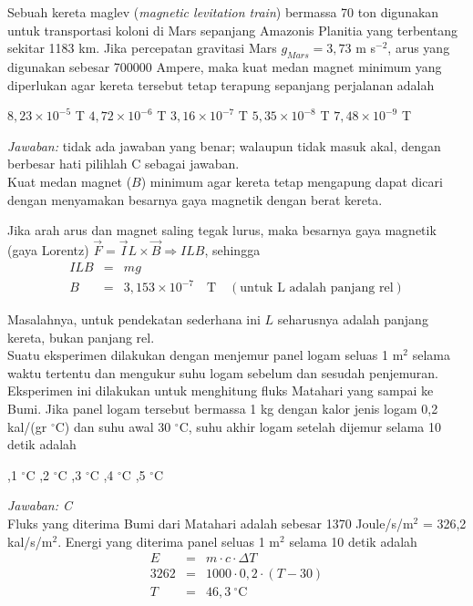 \documentclass[11pt,fleqn]{exam}
\begin{document}
\begin{questions}
\question Sebuah kereta maglev (\textit{magnetic levitation train}) bermassa 70 ton digunakan untuk transportasi koloni di Mars sepanjang Amazonis Planitia yang terbentang sekitar 1183 km. Jika percepatan gravitasi Mars $g_{Mars} = 3,73$ m s$^{-2}$, arus yang digunakan sebesar 700000 Ampere, maka kuat medan magnet minimum yang diperlukan agar kereta tersebut tetap terapung sepanjang perjalanan adalah
\begin{choices}
\choice $8,23 \times 10^{-5}$ T
\choice $4,72 \times 10^{-6}$ T
\choice $3,16 \times 10^{-7}$ T
\choice $5,35 \times 10^{-8}$ T
\choice $7,48 \times 10^{-9}$ T
\end{choices}

\textit{Jawaban: } tidak ada jawaban yang benar; walaupun tidak masuk akal, dengan berbesar hati pilihlah C sebagai jawaban.\\

Kuat medan magnet ($B$) minimum agar kereta tetap mengapung dapat dicari dengan menyamakan besarnya gaya magnetik dengan berat kereta.

Jika arah arus dan magnet saling tegak lurus, maka besarnya gaya magnetik (gaya Lorentz) $\overrightarrow{F} = \overrightarrow{I}L \times \overrightarrow{B} \Rightarrow ILB$, sehingga
\begin{eqnarray*}
ILB &=& mg\\
B &=&3,153 \times 10^{-7} \quad \text{T} \quad (\text{untuk L adalah panjang rel})
\end{eqnarray*}

Masalahnya, untuk pendekatan sederhana ini $L$ seharusnya adalah panjang kereta, bukan panjang rel.\\


\question Suatu eksperimen dilakukan dengan menjemur panel logam seluas 1 m$^2$ selama waktu tertentu dan mengukur suhu logam sebelum dan sesudah penjemuran. Eksperimen ini dilakukan untuk menghitung fluks Matahari yang sampai ke Bumi. Jika panel logam tersebut bermassa 1 kg dengan kalor jenis logam 0,2 kal/(gr $^{\circ}$C) dan suhu awal 30 $^{\circ}$C, suhu akhir logam setelah dijemur selama 10 detik adalah
\begin{choices}
,1 $^{\circ}$C
,2 $^{\circ}$C
,3 $^{\circ}$C
,4 $^{\circ}$C
,5 $^{\circ}$C
\end{choices}


\textit{Jawaban: C}\\

Fluks yang diterima Bumi dari Matahari adalah sebesar 1370 Joule/s/m$^2$ = 326,2 kal/s/m$^{2}$. Energi yang diterima panel seluas 1 m$^2$ selama 10 detik adalah
\begin{eqnarray*}
E &=& m \cdot c \cdot \Delta T\\
3262 &=& 1000 \cdot 0,2 \cdot (T - 30)\\
T &=& 46,3 ~^{\circ}\text{C}
\end{eqnarray*}


\end{questions}
\end{document}
